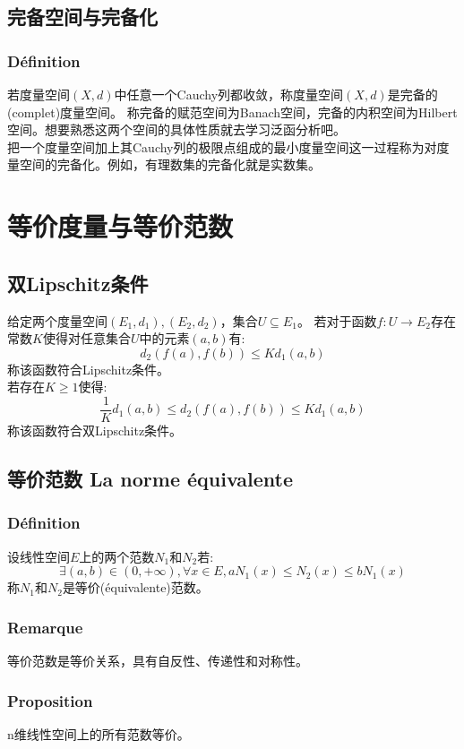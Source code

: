 \documentclass[12pt, a4paper, oneside]{ctexbook}
\begin{document}
  \subsection{完备空间与完备化}
  \subsubsection{Définition}
  若度量空间$(X,d)$中任意一个Cauchy列都收敛，称度量空间$(X,d)$是完备的(complet)度量空间。
  称完备的赋范空间为Banach空间，完备的内积空间为Hilbert空间。想要熟悉这两个空间的具体性质就去学习泛函分析吧。\\

  把一个度量空间加上其Cauchy列的极限点组成的最小度量空间这一过程称为对度量空间的完备化。例如，有理数集的完备化就是实数集。

\section{等价度量与等价范数}
  \subsection{双Lipschitz条件}
  给定两个度量空间$(E_1,d_1),(E_2,d_2)$，集合$U\subseteq E_1$。
  若对于函数$f:U\rightarrow E_2$存在常数$K$使得对任意集合$U$中的元素$(a,b)$有:
  $$
  d_2(f(a),f(b))\leq Kd_1(a,b)
  $$
  称该函数符合Lipschitz条件。\\
  若存在$K\ge 1$使得:
  $$
  \frac{1}{K}d_1(a,b)\leq d_2(f(a),f(b))\leq Kd_1(a,b)
  $$
  称该函数符合双Lipschitz条件。
  \subsection{等价范数 La norme équivalente}
  \subsubsection{Définition}
  设线性空间$E$上的两个范数$N_1$和$N_2$若:
  $$
    \exists(a,b)\in(0,+\infty),\forall x\in E,aN_1(x)\leq N_2(x)\leq bN_1(x)
  $$称$N_1$和$N_2$是等价(équivalente)范数。
  \subsubsection{Remarque}
  等价范数是等价关系，具有自反性、传递性和对称性。
  \subsubsection{Proposition}
  n维线性空间上的所有范数等价。
\end{document}
